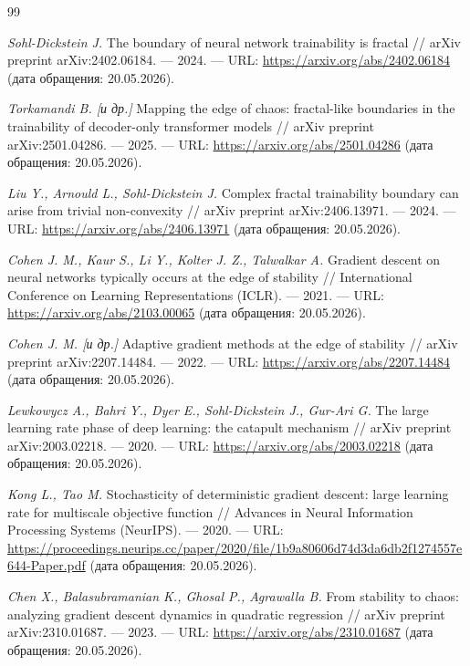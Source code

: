 \begin{thebibliography}{99}

\emph{Sohl-Dickstein J.} The boundary of neural network trainability is fractal
// arXiv preprint arXiv:2402.06184. --- 2024. --- URL:
\url{https://arxiv.org/abs/2402.06184} (дата обращения: 20.05.2026).

\emph{Torkamandi B. [и др.]} Mapping the edge of chaos: fractal-like boundaries
in the trainability of decoder-only transformer models // arXiv preprint
arXiv:2501.04286. --- 2025. --- URL: \url{https://arxiv.org/abs/2501.04286}
(дата обращения: 20.05.2026).

\emph{Liu Y., Arnould L., Sohl-Dickstein J.} Complex fractal trainability
boundary can arise from trivial non-convexity // arXiv preprint
arXiv:2406.13971. --- 2024. --- URL: \url{https://arxiv.org/abs/2406.13971}
(дата обращения: 20.05.2026).

\emph{Cohen J. M., Kaur S., Li Y., Kolter J. Z., Talwalkar A.} Gradient descent
on neural networks typically occurs at the edge of stability //
International Conference on Learning Representations (ICLR). --- 2021. --- URL:
\url{https://arxiv.org/abs/2103.00065} (дата обращения: 20.05.2026).

\emph{Cohen J. M. [и др.]} Adaptive gradient methods at the edge of stability
// arXiv preprint arXiv:2207.14484. --- 2022. --- URL:
\url{https://arxiv.org/abs/2207.14484} (дата обращения: 20.05.2026).

\emph{Lewkowycz A., Bahri Y., Dyer E., Sohl-Dickstein J., Gur-Ari G.} The large
learning rate phase of deep learning: the catapult mechanism // arXiv preprint
arXiv:2003.02218. --- 2020. --- URL: \url{https://arxiv.org/abs/2003.02218}
(дата обращения: 20.05.2026).

\emph{Kong L., Tao M.} Stochasticity of deterministic gradient descent: large
learning rate for multiscale objective function // Advances in Neural
Information Processing Systems (NeurIPS). --- 2020. --- URL:
\url{https://proceedings.neurips.cc/paper/2020/file/1b9a80606d74d3da6db2f1274557e644-Paper.pdf}
(дата обращения: 20.05.2026).

\emph{Chen X., Balasubramanian K., Ghosal P., Agrawalla B.} From stability to
chaos: analyzing gradient descent dynamics in quadratic regression //
arXiv preprint arXiv:2310.01687. --- 2023. --- URL:
\url{https://arxiv.org/abs/2310.01687} (дата обращения: 20.05.2026).


\end{thebibliography}
